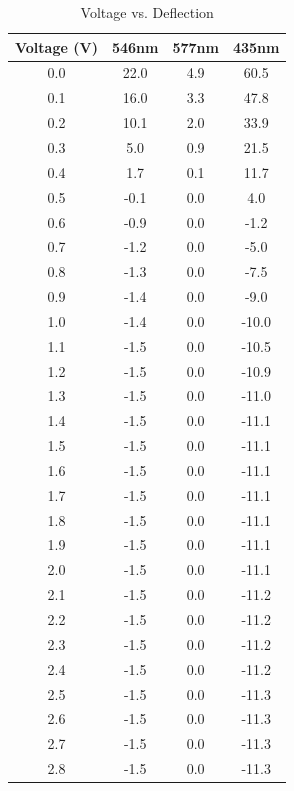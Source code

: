 \documentclass{amsart}
\begin{document}
\begin{table}[H]
    \begin{minipage}{.45\textwidth}
\centering
\caption{Voltage vs. Deflection}
\bigskip \bigskip
\label{my-label}
\begin{tabular}{c|c|c|c}
Voltage (V) & 546nm & 577nm & 435nm \\ \hline
0.0         & 22.0  & 4.9   & 60.5  \\
0.1         & 16.0  & 3.3   & 47.8  \\
0.2         & 10.1  & 2.0   & 33.9  \\
0.3         & 5.0   & 0.9   & 21.5  \\
0.4         & 1.7   & 0.1   & 11.7  \\
0.5         & -0.1  & 0.0   & 4.0   \\
0.6         & -0.9  & 0.0   & -1.2  \\
0.7         & -1.2  & 0.0   & -5.0  \\
0.8         & -1.3  & 0.0   & -7.5  \\
0.9         & -1.4  & 0.0   & -9.0  \\
1.0         & -1.4  & 0.0   & -10.0 \\
1.1         & -1.5  & 0.0   & -10.5 \\
1.2         & -1.5  & 0.0   & -10.9 \\
1.3         & -1.5  & 0.0   & -11.0 \\
1.4         & -1.5  & 0.0   & -11.1 \\
1.5         & -1.5  & 0.0   & -11.1 \\
1.6         & -1.5  & 0.0   & -11.1 \\
1.7         & -1.5  & 0.0   & -11.1 \\
1.8         & -1.5  & 0.0   & -11.1 \\
1.9         & -1.5  & 0.0   & -11.1 \\
2.0         & -1.5  & 0.0   & -11.1 \\
2.1         & -1.5  & 0.0   & -11.2 \\
2.2         & -1.5  & 0.0   & -11.2 \\
2.3         & -1.5  & 0.0   & -11.2 \\
2.4         & -1.5  & 0.0   & -11.2 \\
2.5         & -1.5  & 0.0   & -11.3 \\
2.6         & -1.5  & 0.0   & -11.3 \\
2.7         & -1.5  & 0.0   & -11.3 \\
2.8         & -1.5  & 0.0   & -11.3 \\

\end{tabular}
\end{minipage}
\end{table}
\end{document}
